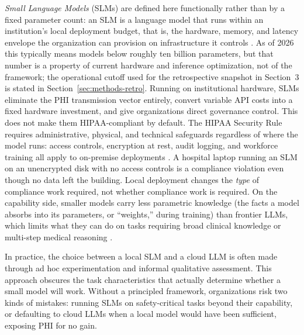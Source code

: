 \documentclass[11pt]{article}
\begin{document}
\textit{Small Language Models} (SLMs) are defined here functionally rather than by a fixed parameter count: an SLM is a language model that runs within an institution's local deployment budget, that is, the hardware, memory, and latency envelope the organization can provision on infrastructure it controls \cite{Zhang2024TinyLlama, Liu2024Mobile}. As of 2026 this typically means models below roughly ten billion parameters, but that number is a property of current hardware and inference optimization, not of the framework; the operational cutoff used for the retrospective snapshot in Section~3 is stated in Section~\ref{sec:methods-retro}. Running on institutional hardware, SLMs eliminate the PHI transmission vector entirely, convert variable API costs into a fixed hardware investment, and give organizations direct governance control. This does not make them HIPAA-compliant by default. The HIPAA Security Rule \cite{HHS2013SecurityRule} requires administrative, physical, and technical safeguards regardless of where the model runs: access controls, encryption at rest, audit logging, and workforce training all apply to on-premise deployments \cite{Marks2023HIPAAAI}. A hospital laptop running an SLM on an unencrypted disk with no access controls is a compliance violation even though no data left the building. Local deployment changes the \emph{type} of compliance work required, not whether compliance work is required. On the capability side, smaller models carry less parametric knowledge (the facts a model absorbs into its parameters, or ``weights,'' during training) than frontier LLMs, which limits what they can do on tasks requiring broad clinical knowledge or multi-step medical reasoning \cite{Li2023TextbooksII}.

In practice, the choice between a local SLM and a cloud LLM is often made through ad hoc experimentation and informal qualitative assessment. This approach obscures the task characteristics that actually determine whether a small model will work. Without a principled framework, organizations risk two kinds of mistakes: running SLMs on safety-critical tasks beyond their capability, or defaulting to cloud LLMs when a local model would have been sufficient, exposing PHI for no gain.
\end{document}

